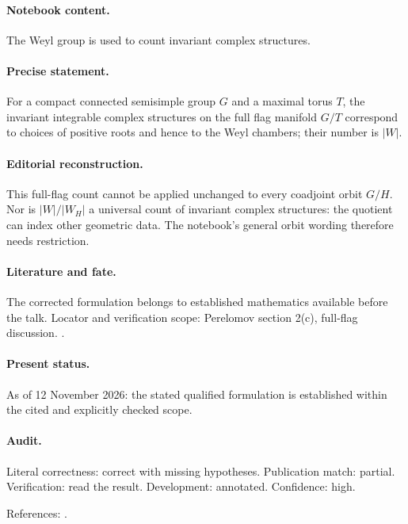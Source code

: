 \paragraph{Notebook content.} The Weyl group is used to count invariant complex structures.

\paragraph{Precise statement.} For a compact connected semisimple group \(G\) and a maximal torus \(T\), the invariant integrable complex structures on the full flag manifold \(G/T\) correspond to choices of positive roots and hence to the Weyl chambers; their number is \(|W|\).

\paragraph{Editorial reconstruction.} This full-flag count cannot be applied unchanged to every coadjoint orbit \(G/H\). Nor is \(|W|/|W_H|\) a universal count of invariant complex structures: the quotient can index other geometric data. The notebook's general orbit wording therefore needs restriction.

\paragraph{Literature and fate.} The corrected formulation belongs to established mathematics available before the talk. Locator and verification scope: Perelomov section 2(c), full-flag discussion. \cite{perelomov1981instantons,borel1954kahler}.

\paragraph{Present status.} As of 12 November 2026: the stated qualified formulation is established within the cited and explicitly checked scope.

\paragraph{Audit.} Literal correctness: correct with missing hypotheses. Publication match: partial. Verification: read the result. Development: annotated. Confidence: high.

\noindent References: \citep{perelomov1981instantons,borel1954kahler}.\par

